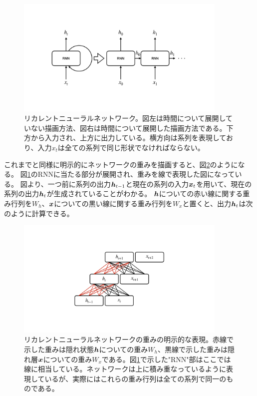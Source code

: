 \begin{figure}[htbp]
 \centering
 \includegraphics[trim = 0 200 0 200, width=0.9\textwidth, clip]{Figure/2DeepLearning/7RecurrentNeuralNetwork.png}
 \caption[リカレントニューラルネットワーク]{リカレントニューラルネットワーク。図左は時間について展開していない描画方法、図右は時間について展開した描画方法である。下方から入力され、上方に出力している。横方向は系列を表現しており、入力$x_t$は全ての系列で同じ形状でなければならない。}
 \label{7RecurrentNeuralNetwork}
\end{figure}

これまでと同様に明示的にネットワークの重みを描画すると、図\ref{8RNNWeight}のようになる。
図\ref{7RecurrentNeuralNetwork}のRNNに当たる部分が展開され、重みを線で表現した図になっている。
図より、一つ前に系列の出力${\mbox{\boldmath{$h$}}}_{t-1}$と現在の系列の入力${\mbox{\boldmath{$x$}}}_t$を用いて、現在の系列の出力${\mbox{\boldmath{$h$}}}_t$が生成されていることがわかる。
${\mbox{\boldmath{$h$}}}$についての赤い線に関する重み行列を$W_h$、${\mbox{\boldmath{$x$}}}$についての黒い線に関する重み行列を$W_x$と置くと、出力${\mbox{\boldmath{$h$}}}_t$は次のように計算できる。

\begin{figure}[htbp]
 \centering
 \includegraphics[trim = 0 200 0 200, width=0.9\textwidth, clip]{Figure/2DeepLearning/8RNNWeight.png}
 \caption[リカレントニューラルネットワークの重みの明示的な表現]{リカレントニューラルネットワークの重みの明示的な表現。赤線で示した重みは隠れ状態${\mbox{\boldmath{$h$}}}$についての重み$W_h$、黒線で示した重みは隠れ層${\mbox{\boldmath{$x$}}}$についての重み$W_x$である。図\ref{7RecurrentNeuralNetwork}で示した"RNN"部はここでは線に相当している。ネットワークは上に積み重なっているように表現しているが、実際にはこれらの重み行列は全ての系列で同一のものである。}
 \label{8RNNWeight}
\end{figure}

